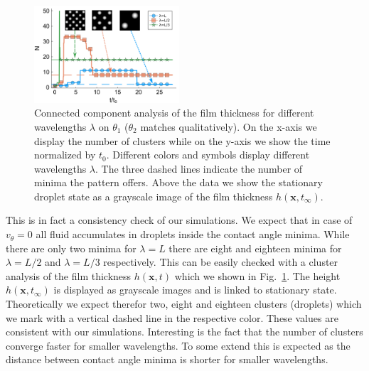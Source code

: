 \documentclass[twocolumn,amsmath,amssymb,showpacs,pre,nofootinbib,superscriptaddress]{revtex4-1} %
\begin{document}
\begin{figure}
    \centering
    \includegraphics[width=0.48\textwidth]{Figures/Clusters_novel_sine_picutres.png}
    \caption{Connected component analysis of the film thickness for different wavelengths $\lambda$ on $\theta_1$ ($\theta_2$ matches qualitatively).
    On the x-axis we display the number of clusters while on the y-axis we show the time normalized by $t_0$.
    Different colors and symbols display different wavelengths $\lambda$.
    The three dashed lines indicate the number of minima the pattern offers.
    Above the data we show the stationary droplet state as a grayscale image of the film thickness $h(\mathbf{x},t_{\infty})$.}
    \label{fig:clusters_v0_sine}
\end{figure}
This is in fact a consistency check of our simulations.
We expect that in case of $v_{\theta} = 0$ all fluid accumulates in droplets inside the contact angle minima.
While there are only two minima for $\lambda = L$ there are eight and eighteen minima for $\lambda = L/2$ and $\lambda = L/3$ respectively.
This can be easily checked with a cluster analysis of the film thickness $h(\mathbf{x},t)$ which we shown in Fig.~\ref{fig:clusters_v0_sine}.
The height $h(\mathbf{x},t_{\infty})$ is displayed as grayscale images and is linked to stationary state.
Theoretically we expect therefor two, eight and eighteen clusters (droplets) which we mark with a vertical dashed line in the respective color.
These values are consistent with our simulations.
Interesting is the fact that the number of clusters converge faster for smaller wavelengths.
To some extend this is expected as the distance between contact angle minima is shorter for smaller wavelengths.
\end{document}
